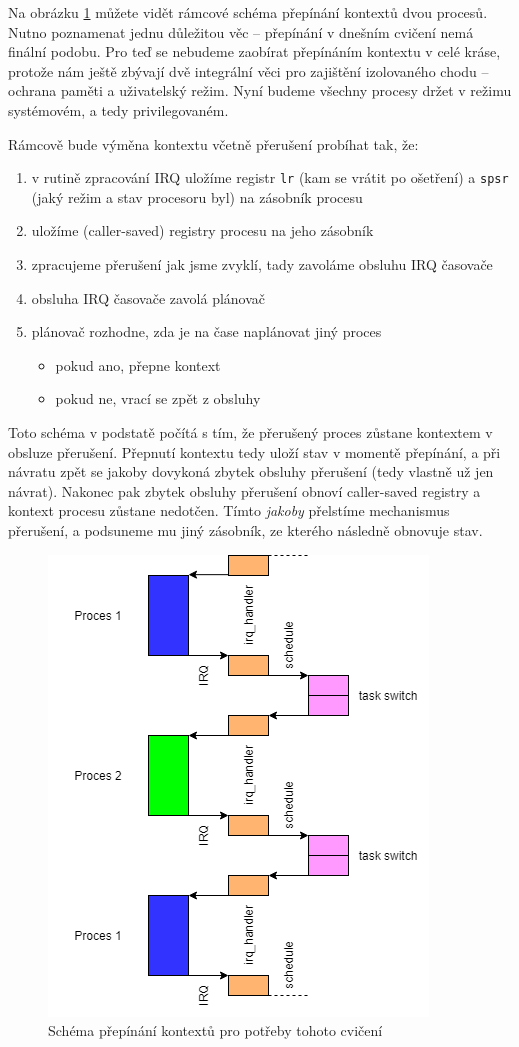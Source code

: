 \documentclass{article}
\begin{document}
Na obrázku \ref{obr:switch} můžete vidět rámcové schéma přepínání kontextů dvou procesů. Nutno poznamenat jednu důležitou věc -- přepínání v dnešním cvičení nemá finální podobu. Pro teď se nebudeme zaobírat přepínáním kontextu v celé kráse, protože nám ještě zbývají dvě integrální věci pro zajištění izolovaného chodu -- ochrana paměti a uživatelský režim. Nyní budeme všechny procesy držet v režimu systémovém, a tedy privilegovaném.

Rámcově bude výměna kontextu včetně přerušení probíhat tak, že:

\begin{enumerate}
	\item v rutině zpracování IRQ uložíme registr \texttt{lr} (kam se vrátit po ošetření) a \texttt{spsr} (jaký režim a stav procesoru byl) na zásobník procesu
	\item uložíme (caller-saved) registry procesu na jeho zásobník
	\item zpracujeme přerušení jak jsme zvyklí, tady zavoláme obsluhu IRQ časovače
	\item obsluha IRQ časovače zavolá plánovač
	\item plánovač rozhodne, zda je na čase naplánovat jiný proces
		\begin{itemize}
			\item pokud ano, přepne kontext
			\item pokud ne, vrací se zpět z obsluhy
		\end{itemize}
\end{enumerate}

Toto schéma v podstatě počítá s tím, že přerušený proces zůstane kontextem v obsluze přerušení. Přepnutí kontextu tedy uloží stav v momentě přepínání, a při návratu zpět se jakoby dovykoná zbytek obsluhy přerušení (tedy vlastně už jen návrat). Nakonec pak zbytek obsluhy přerušení obnoví caller-saved registry a kontext procesu zůstane nedotčen. Tímto \emph{jakoby} přelstíme mechanismus přerušení, a podsuneme mu jiný zásobník, ze kterého následně obnovuje stav.

\begin{figure}[ht]
	\centering
	\includegraphics[width=0.6\linewidth]{OS_irq_taskswitch.png}
	\caption{Schéma přepínání kontextů pro potřeby tohoto cvičení}\label{obr:switch}
\end{figure}
\end{document}
